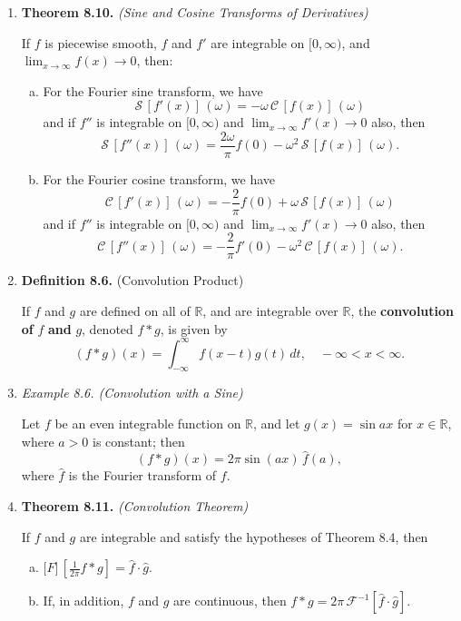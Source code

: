 \begin{enumerate}
\item \textbf{Theorem 8.10.} \textit{(Sine and Cosine Transforms of Derivatives)}

If $f$ is piecewise smooth, $f$ and $f ' $ are integrable on $[0, \infty)$, and $\lim _{x\to \infty} f (x) \to 0$, then:
\begin{enumerate}[(a)]
    \item For the Fourier sine transform, we have
    \[\mathcal{S}\,[f'(x)]\,(\omega) = -\omega\, \mathcal{C}\,[f(x)]\,(\omega)\]
    and if $f ''$ is integrable on $[0, \infty)$ and $\lim _{x\to \infty} f' (x) \to 0$ also, then
    \[\mathcal{S}\,[f''(x)]\,(\omega) = \frac{2\omega}{\pi}f(0) -\omega^{2} \,\mathcal{S}\,[f(x)]\,(\omega).\]
    \item For the Fourier cosine transform, we have
    \[\mathcal{C}\,[f'(x)]\,(\omega) = -\frac{2}{\pi} f(0) + \omega\, \mathcal{S}\,[f(x)]\,(\omega)\]
    and if $f ''$ is integrable on $[0, \infty)$ and $\lim _{x\to \infty} f' (x) \to 0$ also, then
    \[\mathcal{C}\,[f''(x)]\,(\omega) = -\frac{2}{\pi}f'(0) -\omega^{2} \,\mathcal{C}\,[f(x)]\,(\omega).\]
\end{enumerate}



\newpage


\item \textbf{Definition 8.6.} (Convolution Product)

If $f$ and $g$ are defined on all of $\mathbb{R}$, and are integrable over $\mathbb{R}$, the \textbf{convolution of} $f$ \textbf{and} $g$, denoted $f*g$, is given by
\[(f*g)(x) = \int _{-\infty}^{\infty} f(x-t)g(t)\, dt,\quad -\infty <x<\infty.\]




\item \textit{Example 8.6. (Convolution with a Sine)}

Let $f$ be an even integrable function on $\mathbb{R}$, and let $g(x) = \sin ax$ for $x \in \mathbb{R}$, where $a > 0$ is constant; then
\[ (f * g) (x) = 2\pi\sin (a x) \, \widehat f (a),\]
where $\hat f$ is the Fourier transform of $f$.

\newpage 

\item \textbf{Theorem 8.11.} \textit{(Convolution Theorem)}

If $f$ and $g$ are integrable and satisfy the hypotheses of Theorem 8.4, then
\begin{enumerate}[(a)]
    \item $\displaystyle \mathcal[F]\, \left[ \frac{1}{2\pi} f * g\right] = \widehat{f}\cdot \widehat{g}.$
    \item If, in addition, $f$ and $g$ are continuous, then $f * g = 2\pi \, \mathcal{F} ^{-1} \left[  \widehat{f} \cdot \widehat{g} \right] $.
\end{enumerate}



\end{enumerate}

